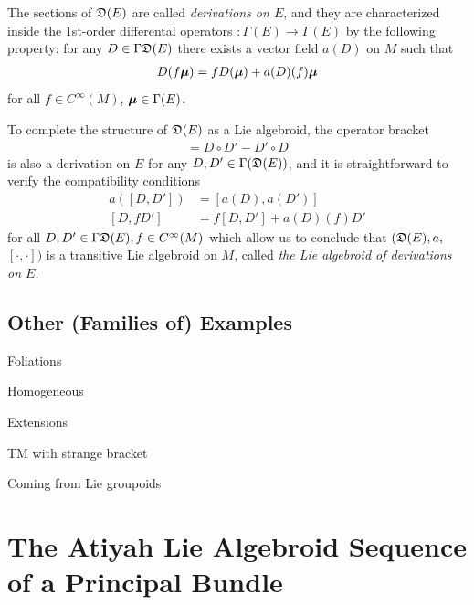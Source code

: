 The sections of $\mathfrak{D}(E)$ are called \emph{derivations on $E$}, and they are characterized inside the $1$st-order differental operators $:\Gamma(E) \to \Gamma(E)$ by the following property: for any $D \in \Gamma \mathfrak{D}(E)$ there exists a vector field $a(D)$ on $M$ such that
\begin{align}
    D(f \bm{\mu}) = f D(\bm{\mu}) + a(D)(f) \bm{\mu}
\end{align}
for all $f \in C^\infty(M)$, $\bm{\mu} \in \Gamma(E)$.

To complete the structure of $\mathfrak{D}(E)$ as a Lie algebroid, the operator bracket
\begin{align*}
    [D, D'] = D \circ D' - D' \circ D
\end{align*}
is also a derivation on $E$ for any $D, D' \in \Gamma(\mathfrak{D}(E))$, and it is straightforward to verify the compatibility conditions
\begin{align}
    a([D, D']) &= [a(D), a(D')] \\
    [D, f D'] &= f[D, D'] + a(D)(f) D'
\end{align}
for all $D, D' \in \Gamma \mathfrak{D}(E), f \in C^\infty(M)$ which allow us to conclude that $(\mathfrak{D}(E), a, $ $[\cdot, \cdot])$ is a transitive Lie algebroid on $M$, called \emph{the Lie algebroid of derivations on $E$}.

\subsection{Other (Families of) Examples}

Foliations

Homogeneous

Extensions

TM with strange bracket

Coming from Lie groupoids

\section{The Atiyah Lie Algebroid Sequence of a Principal Bundle}

